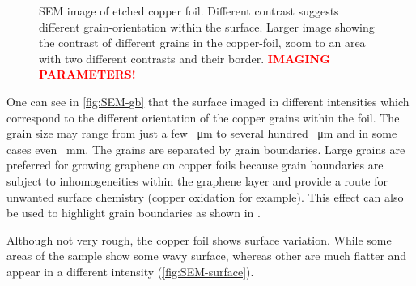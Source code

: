 \begin{figure}[] \centering
	 \quad
	\caption{SEM image of etched copper foil. Different contrast suggests different grain-orientation within the surface.  Larger image showing the contrast of different grains in the copper-foil,  zoom to an area with two different contrasts and their border. \textcolor{red}{\textbf{IMAGING PARAMETERS!}}}
	\label{fig:SEM-gb}
\end{figure}

One can see in \autoref{fig:SEM-gb} that the surface imaged in different intensities which correspond to the different orientation of the copper grains within the foil\cite{wu_effects_2015}. The grain size may range from just a few \SI{}{\micro \meter} to several hundred \SI{}{\micro \meter} and in some cases even \SI{}{\milli \meter}. The grains are separated by grain boundaries. Large grains are preferred for growing graphene on copper foils because grain boundaries are subject to inhomogeneities within the graphene layer and provide a route for unwanted surface chemistry (copper oxidation for example). This effect can also be used to highlight grain boundaries as shown in \cite{wu_effects_2015}.

Although not very rough, the copper foil shows surface variation. While some areas of the sample show some wavy surface, whereas other are much flatter and appear in a different intensity (\autoref{fig:SEM-surface}).

